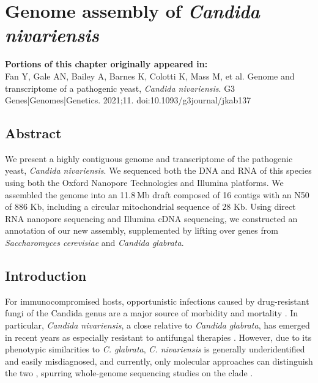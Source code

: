 \chapter{Genome assembly of \textit{Candida nivariensis}}
\label{chap:nivar}

\textbf{Portions of this chapter originally appeared in:} \\
Fan Y, Gale AN, Bailey A, Barnes K, Colotti K, Mass M, et al. Genome and transcriptome of a pathogenic yeast, \textit{Candida nivariensis}. G3 Genes|Genomes|Genetics. 2021;11. doi:10.1093/g3journal/jkab137

\section{Abstract}
\label{sec:abstract}

We present a highly contiguous genome and transcriptome of the pathogenic yeast, \textit{Candida nivariensis}. We sequenced both the DNA and RNA of this species using both the Oxford Nanopore Technologies and Illumina platforms. We assembled the genome into an 11.8 Mb draft composed of 16 contigs with an N50 of 886 Kb, including a circular mitochondrial sequence of 28 Kb. Using direct RNA nanopore sequencing and Illumina cDNA sequencing, we constructed an annotation of our new assembly, supplemented by lifting over genes from \textit{Saccharomyces cerevisiae} and \textit{Candida glabrata}.

\section{Introduction}
\label{sec:intro}

For immunocompromised hosts, opportunistic infections caused by drug-resistant fungi of the Candida genus are a major source of morbidity and mortality \citep{Borman2008-cr}. In particular, \textit{Candida nivariensis}, a close relative to \textit{Candida glabrata}, has emerged in recent years as especially resistant to antifungal therapies \citep{Borman2008-cr}. However, due to its phenotypic similarities to \textit{C. glabrata}, \textit{C. nivariensis} is generally underidentified and easily misdiagnosed, and currently, only molecular approaches can distinguish the two \citep{Aznar-Marin2016-yp}, spurring whole-genome sequencing studies on the clade \citep{Gabaldon2013-bk}.

